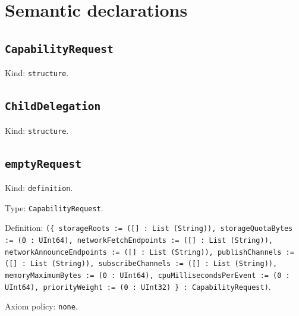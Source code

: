 \documentclass[11pt]{article}
\begin{document}
\section*{Semantic declarations}
\subsection*{\texttt{CapabilityRequest}}
\noindent Kind: \texttt{structure}.\par
\subsection*{\texttt{ChildDelegation}}
\noindent Kind: \texttt{structure}.\par
\subsection*{\texttt{emptyRequest}}
\noindent Kind: \texttt{definition}.\par
\noindent Type: \texttt{CapabilityRequest}.\par
\noindent Definition: \texttt{(\{ storageRoots := ([] : List (String)), storageQuotaBytes := (0 : UInt64), networkFetchEndpoints := ([] : List (String)), networkAnnounceEndpoints := ([] : List (String)), publishChannels := ([] : List (String)), subscribeChannels := ([] : List (String)), memoryMaximumBytes := (0 : UInt64), cpuMillisecondsPerEvent := (0 : UInt64), priorityWeight := (0 : UInt32) \} : CapabilityRequest)}.\par
\noindent Axiom policy: \texttt{none}.\par
\end{document}
